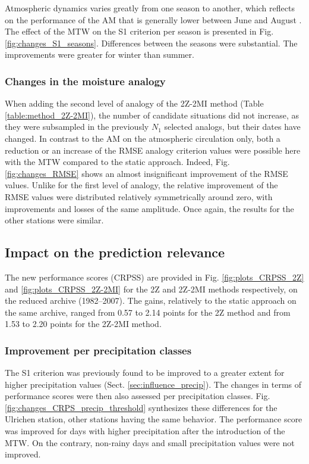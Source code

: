 \documentclass[hess, manuscript]{copernicus}
\begin{document}
Atmospheric dynamics varies greatly from one season to another, which reflects on the performance of the AM that is generally lower between June and August \citep{Bliefernicht2010}. The effect of the MTW on the S1 criterion per season is presented in Fig. \ref{fig:changes_S1_seasons}. Differences between the seasons were substantial. The improvements were greater for winter than summer. 


\subsubsection{Changes in the moisture analogy}

When adding the second level of analogy of the 2Z-2MI method (Table \ref{table:method_2Z-2MI}), the number of candidate situations did not increase, as they were subsampled in the previously $N_{1}$ selected analogs, but their dates have changed. In contrast to the AM on the atmospheric circulation only, both a reduction or an increase of the RMSE analogy criterion values were possible here with the MTW compared to the static approach. Indeed, Fig. \ref{fig:changes_RMSE} shows an almost insignificant improvement of the RMSE values. Unlike for the first level of analogy, the relative improvement of the RMSE values were distributed relatively symmetrically around zero, with improvements and losses of the same amplitude. Once again, the results for the other stations were similar.


\subsection{Impact on the prediction relevance}
\label{sec:influence_scores}

The new performance scores (CRPSS) are provided in Fig. \ref{fig:plots_CRPSS_2Z} and \ref{fig:plots_CRPSS_2Z-2MI} for the 2Z and 2Z-2MI methods respectively, on the reduced archive (1982--2007). The gains, relatively to the static approach on the same archive, ranged from 0.57 to 2.14 points for the 2Z method and from 1.53 to 2.20 points for the 2Z-2MI method. 


\subsubsection{Improvement per precipitation classes}
\label{sec:improvement_CRPSS_precip_threshold}

The S1 criterion was previously found to be improved to a greater extent for higher precipitation values (Sect. \ref{sec:influence_precip}). The changes in terms of performance scores were then also assessed per precipitation classes. Fig. \ref{fig:changes_CRPS_precip_threshold} synthesizes these differences for the Ulrichen station, other stations having the same behavior. The performance score was improved for days with higher precipitation after the introduction of the MTW. On the contrary, non-rainy days and small precipitation values were not improved.
\end{document}
